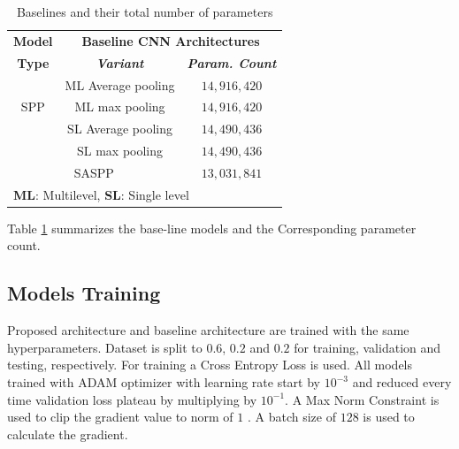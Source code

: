 \begin{table}[htbp]
\caption{Baselines and their total number of parameters}
\begin{center}
\begin{tabular}{|c|c|c|}
\hline
\textbf{Model}&\multicolumn{2}{|c|}{\textbf{Baseline CNN Architectures}} \\
\cline{2-3} 
\textbf{Type} & \textbf{\textit{Variant}}& \textbf{\textit{Param. Count}} \\
\hline
  & ML Average pooling & $14,916,420$   \\
\cline{2-3} 
SPP & ML max pooling & $14,916,420$   \\
\cline{2-3} 
  & SL Average pooling & $14,490,436$   \\
\cline{2-3} 
  & SL max pooling & $14,490,436$ \\
\hline
\multicolumn{2}{|c|}{SASPP} & $13,031,841$\\
\hline
\multicolumn{3}{l}{ \textbf{ML}: Multilevel, \textbf{SL}: Single level}
\end{tabular}
\label{Basarch}
\end{center}
\end{table}
Table \ref{Basarch} summarizes the base-line models and the Corresponding parameter count.
\subsection{Models Training}
Proposed architecture and baseline architecture are trained with the same hyperparameters. Dataset is split to $0.6$, $0.2$ and $0.2$ for training, validation and testing, respectively. For training a Cross Entropy Loss is used. All models trained with ADAM \cite{kingma2014adam} optimizer with learning rate start by $10^{-3}$ and reduced every time validation loss plateau by multiplying by $10^{-1}$. A Max Norm Constraint is used to clip the gradient value to norm of $1$ \cite{krizhevsky2012imagenet}. A batch size of $128$ is used to calculate the gradient.

